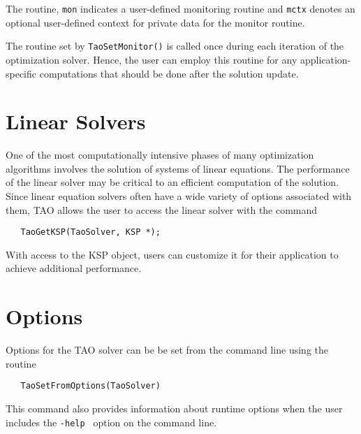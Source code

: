The routine, {\tt mon} indicates a user-defined monitoring routine
and {\tt mctx} denotes an optional user-defined context for private 
data for the monitor routine.

The routine set by {\tt TaoSetMonitor()} is called once during each
iteration of the optimization solver.  Hence, the
user can employ this routine for any application-specific computations
that should be done after the solution update. 


\section{Linear Solvers}\label{sec:TaoLinearSolvers}
One of the most computationally intensive phases of many optimization
algorithms involves the solution of systems of linear equations.  
The performance
of the linear solver may be critical to an efficient computation
of the solution.
Since linear equation solvers often have a wide variety of options 
associated with them, TAO allows the user to access the linear
solver with the command

\begin{verbatim}
   TaoGetKSP(TaoSolver, KSP *);
\end{verbatim}

\noindent
With access to the KSP object, users can customize it for their application
to achieve additional performance.


\section{Options}
Options for the TAO solver 
can be be set from the command line using the routine  
\begin{verbatim}
   TaoSetFromOptions(TaoSolver)
\end{verbatim}
This command also provides information about runtime options when the
user includes the {\tt -help } option on the
command line.

